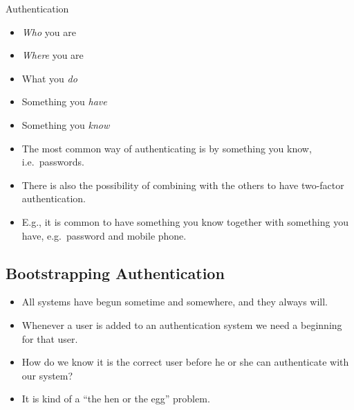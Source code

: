 \documentclass{beamer}
\begin{document}
\begin{frame}{\insertsubsectionhead}{Authentication}
  \begin{itemize}
    \item \emph{Who} you are
    \item \emph{Where} you are
    \item What you \emph{do}
    \item Something you \emph{have}
    \item Something you \emph{know}
  \end{itemize}
\end{frame}

\begin{frame}{\insertsubsectionhead}
  \begin{itemize}
    \item The most common way of authenticating is by something you know, i.e.\ 
      passwords.

    \item There is also the possibility of combining with the others to have 
      two-factor authentication.

    \item E.g., it is common to have something you know together with something 
      you have, e.g.\ password and mobile phone.

  \end{itemize}
\end{frame}

\subsection{Bootstrapping Authentication}

\begin{frame}{\insertsubsectionhead}
  \begin{itemize}
    \item All systems have begun sometime and somewhere, and they always will.

    \item Whenever a user is added to an authentication system we need 
      a beginning for that user.

    \item How do we know it is the correct user before he or she can 
      authenticate with our system?

    \item It is kind of a ``the hen or the egg'' problem.

  \end{itemize}
\end{frame}
\end{document}
